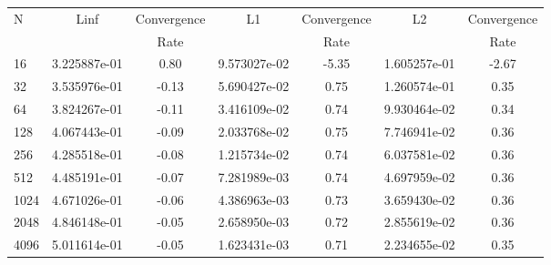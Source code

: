 \documentclass[12pt]{article}
\begin{document}
	\begin{tabular}{l|c|c|c|c|c|c}
		N&Linf&Convergence&L1&Convergence&L2&Convergence\\
		&&Rate&&Rate&&Rate\\
		\hline
		16&3.225887e-01&0.80&9.573027e-02&-5.35&1.605257e-01&-2.67\\
		\hline
		32&3.535976e-01&-0.13&5.690427e-02&0.75&1.260574e-01&0.35\\
		\hline
		64&3.824267e-01&-0.11&3.416109e-02&0.74&9.930464e-02&0.34\\
		\hline
		128&4.067443e-01&-0.09&2.033768e-02&0.75&7.746941e-02&0.36\\
		\hline
		256&4.285518e-01&-0.08&1.215734e-02&0.74&6.037581e-02&0.36\\
		\hline
		512&4.485191e-01&-0.07&7.281989e-03&0.74&4.697959e-02&0.36\\
		\hline
		1024&4.671026e-01&-0.06&4.386963e-03&0.73&3.659430e-02&0.36\\
		\hline
		2048&4.846148e-01&-0.05&2.658950e-03&0.72&2.855619e-02&0.36\\
		\hline
		4096&5.011614e-01&-0.05&1.623431e-03&0.71&2.234655e-02&0.35\\
	\end{tabular}
\end{document}
